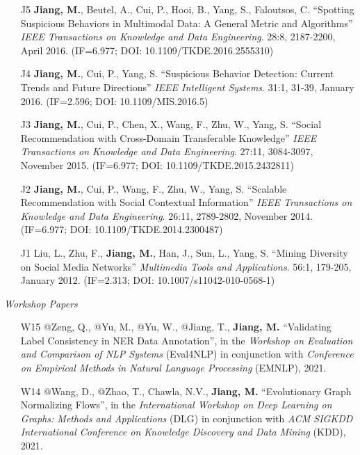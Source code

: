 \documentclass[10pt]{article}
\newenvironment{myindentpar}[1]%
{\begin{list}{}%
         {\setlength{\leftmargin}{#1}}%
         \item[]%
}
{\end{list}}
\newcounter{list}
\begin{document}
\begin{myindentpar}{0.00cm}
\begin{enumerate}[leftmargin=.5cm]
\item[J5] \textbf{Jiang, M.}, Beutel, A., Cui, P., Hooi, B., Yang, S., Faloutsos, C. ``Spotting Suspicious Behaviors in Multimodal Data: A General Metric and Algorithms'' \textit{IEEE Transactions on Knowledge and Data Engineering}. 28:8, 2187-2200, April 2016. (IF=6.977; DOI: 10.1109/TKDE.2016.2555310)

\item[J4] \textbf{Jiang, M.}, Cui, P., Yang, S. ``Suspicious Behavior Detection: Current Trends and Future Directions'' \textit{IEEE Intelligent Systems}. 31:1, 31-39, January 2016. (IF=2.596; DOI: 10.1109/MIS.2016.5)

\item[J3] \textbf{Jiang, M.}, Cui, P., Chen, X., Wang, F., Zhu, W., Yang, S. ``Social Recommendation with Cross-Domain Transferable Knowledge'' \textit{IEEE Transactions on Knowledge and Data Engineering}. 27:11, 3084-3097, November 2015. (IF=6.977; DOI: 10.1109/TKDE.2015.2432811)

\item[J2] \textbf{Jiang, M.}, Cui, P., Wang, F., Zhu, W., Yang, S. ``Scalable Recommendation with Social Contextual Information'' \textit{IEEE Transactions on Knowledge and Data Engineering}. 26:11, 2789-2802, November 2014. (IF=6.977; DOI: 10.1109/TKDE.2014.2300487)

\item[J1] Liu, L., Zhu, F., \textbf{Jiang, M.}, Han, J., Sun, L., Yang, S. ``Mining Diversity on Social Media Networks'' \textit{Multimedia Tools and Applications}. 56:1, 179-205, January 2012. (IF=2.313; DOI: 10.1007/s11042-010-0568-1)

\end{enumerate}

\hspace{-0.25cm}\textit{Workshop Papers}

\begin{enumerate}[leftmargin=.5cm]

\item[W15] @Zeng, Q., @Yu, M., @Yu, W., @Jiang, T., \textbf{Jiang, M.} ``Validating Label Consistency in NER Data Annotation'', in the \textit{Workshop on Evaluation and Comparison of NLP Systems} (Eval4NLP) in conjunction with \textit{Conference on Empirical Methods in Natural Language Processing} (EMNLP), 2021.

\item[W14] @Wang, D., @Zhao, T., Chawla, N.V., \textbf{Jiang, M.} ``Evolutionary Graph Normalizing Flows'', in the \textit{International Workshop on Deep Learning on Graphs: Methods and Applications} (DLG) in conjunction with \textit{ACM SIGKDD International Conference on Knowledge Discovery and Data Mining} (KDD), 2021.


\end{enumerate}
\end{myindentpar}
\end{document}
